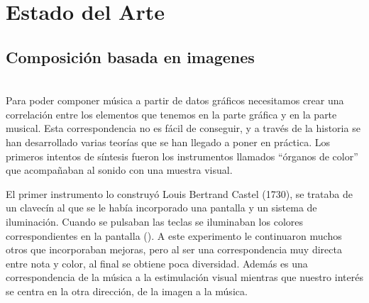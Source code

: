 \section{Estado del Arte}
\label{sec:estadodelarte}



\subsection{Composición basada en imagenes}

\\

Para poder componer música a partir de datos gráficos necesitamos crear una correlación entre los elementos que tenemos en la parte gráfica y en la parte musical. Esta correspondencia no es fácil de conseguir, y a través de la historia se han desarrollado varias teorías que se han llegado a poner en práctica. Los primeros intentos de síntesis fueron los instrumentos llamados ``órganos de color'' que acompañaban al sonido con una muestra visual.

El primer instrumento lo construyó Louis Bertrand Castel (1730), se trataba de un clavecín al que se le había incorporado una pantalla y un sistema de iluminación. Cuando se pulsaban las teclas se iluminaban los colores correspondientes en la pantalla (\cite{organosColor}). A este experimento le continuaron muchos otros que incorporaban mejoras, pero al ser una correspondencia muy directa entre nota y color, al final se obtiene poca diversidad. Además es una correspondencia de la música a la estimulación visual mientras que nuestro interés se centra en la otra dirección, de la imagen a la música.\\

